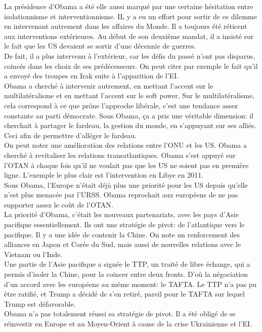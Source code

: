 \documentclass[10pt, a4paper, openany]{book}
\begin{document}
La présidence d'Obama a été elle aussi marqué par une certaine hésitation entre isolationnisme et interventionnisme. IL y a eu un effort pour sortir de ce dilemme en intervenant autrement dans les affaires du Monde. Il a toujours été réticent aux interventions extérieures. Au début de son deuxième mandat, il a insisté sur le fait que les US devaient se sortir d'une décennie de guerres. \\
De fait, il a plus intervenu à l'extérieur, car les défis du passé n'ont pas disparus, coincés dans les choix de ses prédécesseurs. On peut citer par exemple le fait qu'il a envoyé des troupes en Irak suite à l'apparition de l'EI. \\
Obama a cherché à intervenir autrement, en mettant l'accent sur le multilatéralisme et en mettant l'accent sur le soft power. Sur le multilatéralisme, cela correspond à ce que prône l'approche libérale, c'est une tendance assez constante au parti démocrate. Sous Obama, ça a pris une véritable dimension: il cherchait à partager le fardeau, la gestion du monde, en s'appuyant sur ses alliés. Ceci afin de permettre d'alléger le fardeau. \\
On peut noter une amélioration des relations entre l'ONU et les US. Obama a cherché à revitaliser les relations transatlantiques. Obama s'est appuyé sur l'OTAN à chaque fois qu'il ne voulait pas que les US ne soient pas en première ligne. L'exemple le plus clair est l'intervention en Libye en 2011. \\
Sous Obama, l'Europe n'était déjà plus une priorité pour les US depuis qu'elle n'est plus menacée par l'URSS. Obama reprochait aux européens de ne pas supporter assez le coût de l'OTAN. \\
La priorité d'Obama, c'était les nouveaux partenariats, avec les pays d'Asie pacifique essentiellement. Ils ont une stratégie de pivot: de l'atlantique vers le pacifique. Il y a une idée de contenir la Chine. On note un renforcement des alliances en Japon et Corée du Sud, mais aussi de nouvelles relations avec le Vietnam ou l'Inde. \\
Une partie de l'Asie pacifique a signée le TTP, un traité de libre échange, qui a permis d'isoler la Chine, pour la coincer entre deux fronts. D'où la négociation d'un accord avec les européens au même moment: le TAFTA. Le TTP n'a pas pu être ratifié, et Trump a décidé de s'en retiré, pareil pour le TAFTA sur lequel Trump est défavorable. \\
Obama n'a pas totalement réussi sa stratégie de pivot. Il a été obligé de se réinvestir en Europe et au Moyen-Orient à cause de la crise Ukrainienne et l'EI. 
\end{document}
